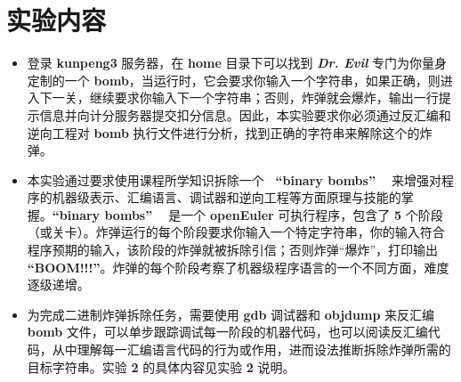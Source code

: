 \section{实验内容}
    \begin{itemize}
        \item 登录 \textbf{kunpeng3} 服务器，在 \textbf{home} 目录下可以找到 \textbf{\textit{Dr. Evil}} 专门为你量身定制的一个 \textbf{bomb}，当运行时，它会要求你输入一个字符串，如果正确，则进入下一关，继续要求你输入下一个字符串；否则，炸弹就会爆炸，输出一行提示信息并向计分服务器提交扣分信息。因此，本实验要求你必须通过反汇编和逆向工程对 \textbf{bomb} 执行文件进行分析，找到正确的字符串来解除这个的炸弹。
        \item 本实验通过要求使用课程所学知识拆除一个 \textbf{ \ “binary bombs” \ } 来增强对程序的机器级表示、汇编语言、调试器和逆向工程等方面原理与技能的掌握。\textbf{“binary bombs” \ } 是一个 \textbf{openEuler} 可执行程序，包含了 \textbf{5} 个阶段（或关卡）。炸弹运行的每个阶段要求你输入一个特定字符串，你的输入符合程序预期的输入，该阶段的炸弹就被拆除引信；否则炸弹“爆炸”，打印输出 \textbf{“BOOM!!!”}。炸弹的每个阶段考察了机器级程序语言的一个不同方面，难度逐级递增。
        \item 为完成二进制炸弹拆除任务，需要使用 \textbf{gdb} 调试器和 \textbf{objdump} 来反汇编 \textbf{bomb} 文件，可以单步跟踪调试每一阶段的机器代码，也可以阅读反汇编代码，从中理解每一汇编语言代码的行为或作用，进而设法推断拆除炸弹所需的目标字符串。实验 \textbf{2} 的具体内容见实验 \textbf{2} 说明。
    \end{itemize}